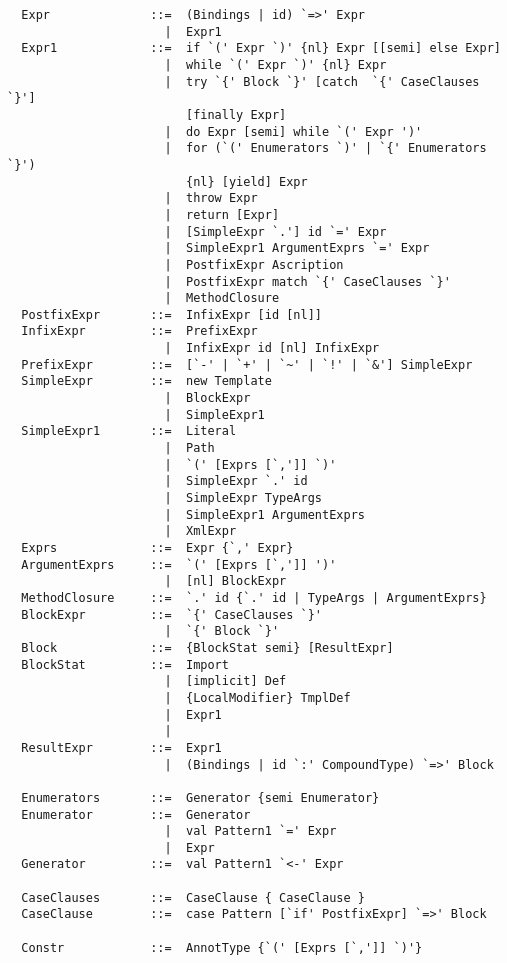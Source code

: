 {\begin{lstlisting}
  Expr              ::=  (Bindings | id) `=>' Expr
                      |  Expr1
  Expr1             ::=  if `(' Expr `)' {nl} Expr [[semi] else Expr]
                      |  while `(' Expr `)' {nl} Expr
                      |  try `{' Block `}' [catch  `{' CaseClauses `}'] 
                         [finally Expr]
                      |  do Expr [semi] while `(' Expr ')'
                      |  for (`(' Enumerators `)' | `{' Enumerators `}') 
                         {nl} [yield] Expr
                      |  throw Expr
                      |  return [Expr]
                      |  [SimpleExpr `.'] id `=' Expr
                      |  SimpleExpr1 ArgumentExprs `=' Expr
                      |  PostfixExpr Ascription
                      |  PostfixExpr match `{' CaseClauses `}'
                      |  MethodClosure
  PostfixExpr       ::=  InfixExpr [id [nl]]
  InfixExpr         ::=  PrefixExpr
                      |  InfixExpr id [nl] InfixExpr
  PrefixExpr        ::=  [`-' | `+' | `~' | `!' | `&'] SimpleExpr 
  SimpleExpr        ::=  new Template
                      |  BlockExpr
                      |  SimpleExpr1
  SimpleExpr1       ::=  Literal
                      |  Path
                      |  `(' [Exprs [`,']] `)'
                      |  SimpleExpr `.' id 
                      |  SimpleExpr TypeArgs
                      |  SimpleExpr1 ArgumentExprs
                      |  XmlExpr
  Exprs             ::=  Expr {`,' Expr}
  ArgumentExprs     ::=  `(' [Exprs [`,']] ')'
                      |  [nl] BlockExpr
  MethodClosure     ::=  `.' id {`.' id | TypeArgs | ArgumentExprs}
  BlockExpr         ::=  `{' CaseClauses `}'
                      |  `{' Block `}'
  Block             ::=  {BlockStat semi} [ResultExpr]
  BlockStat         ::=  Import
                      |  [implicit] Def
                      |  {LocalModifier} TmplDef
                      |  Expr1
                      |
  ResultExpr        ::=  Expr1
                      |  (Bindings | id `:' CompoundType) `=>' Block

  Enumerators       ::=  Generator {semi Enumerator}
  Enumerator        ::=  Generator
                      |  val Pattern1 `=' Expr
                      |  Expr
  Generator         ::=  val Pattern1 `<-' Expr

  CaseClauses       ::=  CaseClause { CaseClause }
  CaseClause        ::=  case Pattern [`if' PostfixExpr] `=>' Block 

  Constr            ::=  AnnotType {`(' [Exprs [`,']] `)'}


\end{lstlisting}}
